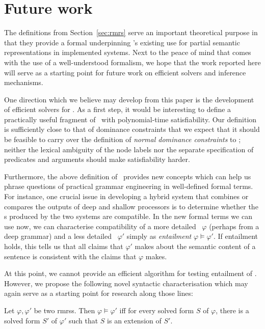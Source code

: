 \section{Future work}
\label{sec:entailment}

The definitions from Section~\ref{sec:rmrs} serve an important
theoretical purpose in that they provide a formal underpinning \rmrs's
existing use for partial semantic representations in implemented
systems.  Next to the peace of mind that comes with the use of a
well-understood formalism, we hope that the work reported here will
serve as a starting point for future work on efficient solvers and
inference mechanisms.

One direction which we believe may develop from this paper is the
development of efficient solvers for \rmrs.  As a first step, it would
be interesting to define a practically useful fragment of \rmrs\ with
polynomial-time satisfiability.  Our definition is sufficiently close
to that of dominance constraints that we expect that it should be
feasible to carry over the definition of \emph{normal dominance
  constraints} \cite{Althaus_etal:JoA} to \rmrs; neither the lexical
ambiguity of the node labels nor the separate specification of
predicates and arguments should make satisfiability harder.

Furthermore, the above definition of \rmrs\ provides new concepts
which can help us phrase questions of practical grammar engineering in
well-defined formal terms.  For instance, one crucial issue in
developing a hybrid system that combines or compares the outputs of
deep and shallow processors is to determine whether the \rmrs s
produced by the two systems are compatible.  In the new formal terms
we can use now, we can characterise compatibility of a more detailed
\rmrs\ $\varphi$ (perhaps from a deep grammar) and a less detailed
\rmrs\ $\varphi'$ simply as \emph{entailment} $\varphi \models
\varphi'$.  If entailment holds, this tells us that all claims that
$\varphi'$ makes about the semantic content of a sentence is
consistent with the claims that $\varphi$ makes.

At this point, we cannot provide an efficient algorithm for testing
entailment of \rmrs.  However, we propose the following novel
syntactic characterisation which may again serve as a starting point
for research along those lines:


\begin{prop}\label{thm:big-one}
  Let $\varphi, \varphi'$ be two {\sc rmrs}s.  Then $\varphi \models
  \varphi'$ iff for every solved form $S$ of $\varphi$, there is a
  solved form $S'$ of $\varphi'$ such that $S$ is an extension of
  $S'$. 
\end{prop}


